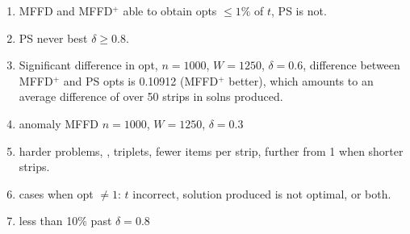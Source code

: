\documentclass[oribibl]{llncs}
\begin{document}
\begin{enumerate}
	\item MFFD and MFFD$^+$ able to obtain opts $\leq 1\%$ of $t$, PS is not.
	\item PS never best $\delta \geq 0.8$.
	\item Significant difference in opt, $n = 1000$, $W = 1250$, $\delta = 0.6$, difference between MFFD$^+$ and PS opts is 0.10912 (MFFD$^+$ better), which amounts to an average difference of over 50 strips in solns produced.
	\item anomaly MFFD $n = 1000$, $W = 1250$, $\delta = 0.3$
	\item harder problems, \cite{falkenauer1996}, triplets, fewer items per strip, further from 1 when shorter strips.
	\item cases when opt $\neq 1$: $t$ incorrect, solution produced is not optimal, or both.
	\item less than 10\% past $\delta = 0.8$
\end{enumerate}
\end{document}

